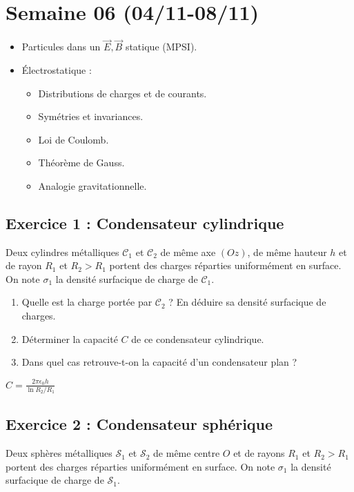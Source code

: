 \section{Semaine 06 (04/11-08/11) }

\begin{itemize}
	\item Particules dans un $\vec{E}, \vec{B}$ statique (MPSI).
	\item Électrostatique :
	\begin{itemize}
		\item Distributions de charges et de courants.
		\item Symétries et invariances.
		\item Loi de Coulomb.
		\item Théorème de Gauss.
		\item Analogie gravitationnelle.
	\end{itemize}
\end{itemize}

\subsection{Exercice 1 : Condensateur cylindrique}

Deux cylindres métalliques $\mathcal{C}_1$ et $\mathcal{C}_2$ de même axe $(Oz)$, de même hauteur $h$ et de rayon $R_1$ et $R_2 > R_1$ portent des charges réparties uniformément en surface. On note $\sigma_1$ la densité surfacique de charge de $\mathcal{C}_1$.

\begin{enumerate}
	\item Quelle est la charge portée par $\mathcal{C}_2$ ? En déduire sa densité surfacique de charges.
	\item Déterminer la capacité $C$ de ce condensateur cylindrique. 
	\item Dans quel cas retrouve-t-on la capacité d'un condensateur plan ?
\end{enumerate}

 $C = \frac{2 \pi \epsilon_0 h}{\ln{R_2/R_1}}$

\subsection{Exercice 2 : Condensateur sphérique}

Deux sphères métalliques $\mathcal{S}_1$ et $\mathcal{S}_2$ de même centre $O$ et de rayons $R_1$ et $R_2 > R_1$ portent des charges réparties uniformément en surface. On note $\sigma_1$ la densité surfacique de charge de $\mathcal{S}_1$.

